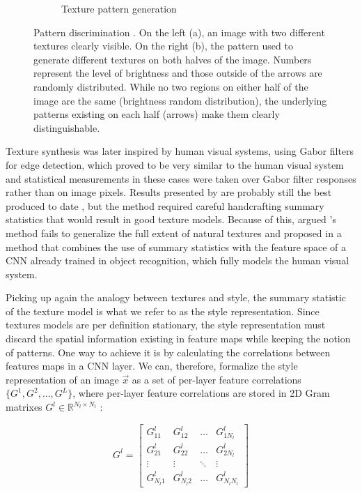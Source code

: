 \begin{figure}[htb]
\begin{subfigure}[b]{0.5\textwidth}
    \caption{Texture pattern generation}
    \label{sub:system:method:style-reconstruction:texture-2}
  \end{subfigure}
  \caption{Pattern discrimination \cite{Julesz1962}.
    On the left (a), an image with two different textures clearly visible.
    On the right (b), the pattern used to generate different textures on both halves of the image.
    Numbers represent the level of brightness and those outside of the arrows are randomly distributed.
    While no two regions on either half of the image are the same (brightness random distribution), the underlying patterns existing on each half (arrows) make them clearly distinguishable.}
  \label{sub:system:method:style-reconstruction:texture}
\end{figure}

Texture synthesis was later inspired by human visual systems, using Gabor filters for edge detection, which proved to be very similar to the human visual system \cite{Heeger1995,Portilla2000} and statistical measurements in these cases were taken over Gabor filter responses rather than on image pixels.
Results presented by \citet{Portilla2000} are probably still the best produced to date \cite{Gatys2015A}, but the method required careful handcrafting summary statistics that would result in good texture models.
Because of this, \citeauthor{Gatys2015A} argued \citeauthor{Portilla2000}'s method fails to generalize the full extent of natural textures and proposed in \cite{Gatys2015A} a method that combines the use of summary statistics with the feature space of a CNN already trained in object recognition, which fully models the human visual system.

Picking up again the analogy between textures and style, the summary statistic of the texture model is what we refer to as the style representation.
Since textures models are per definition stationary, the style representation must discard the spatial information existing in feature maps while keeping the notion of patterns.
One way to achieve it is by calculating the correlations between features maps in a CNN layer.
We can, therefore, formalize the style representation of an image $\vec{x}$ as a set of per-layer feature correlations $\{G^1, G^2, \dots, G^L\}$, where per-layer feature correlations are stored in 2D Gram matrixes $G^l \in \mathbb{R}^{{N_l}\times{N_l}}$ \cite[Theorem~7.2.10]{Horn2012}:

\begin{equation}
  G^l =
  \begin{bmatrix}
    G^l_{11}   & G^l_{12}   & \dots  & G^l_{1N_l} \\
    G^l_{21}   & G^l_{22}   & \dots  & G^l_{2N_l} \\
    \vdots     & \vdots     & \ddots & \vdots   \\
    G^l_{N_l1} & G^l_{N_l2} & \dots  & G^l_{N_lN_l}
  \end{bmatrix}
\end{equation}

